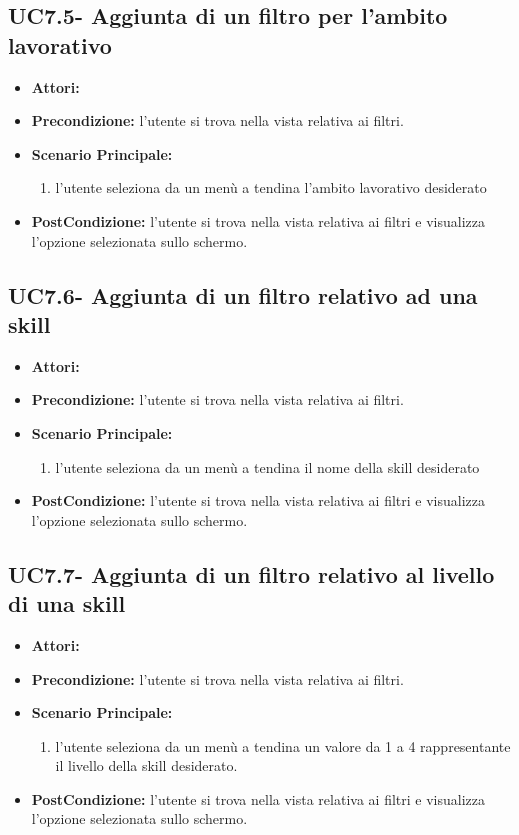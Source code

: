 \subsection{UC7.5- Aggiunta di un filtro per l'ambito lavorativo}
\begin{itemize}
	\item \textbf{Attori:}\loggedusr
	\item \textbf{Precondizione:} l'utente si trova nella vista relativa ai filtri.
	\item \textbf{Scenario Principale:}
	\begin{enumerate}
		\item l'utente seleziona da un menù a tendina l'ambito lavorativo desiderato
	\end{enumerate}
	\item \textbf{PostCondizione:}  l'utente si trova nella vista relativa ai filtri e visualizza l'opzione selezionata sullo schermo.
\end{itemize}

\subsection{UC7.6- Aggiunta di un filtro relativo ad una skill }
\begin{itemize}
	\item \textbf{Attori:}\loggedusr
	\item \textbf{Precondizione:} l'utente si trova nella vista relativa ai filtri.
	\item \textbf{Scenario Principale:}
	\begin{enumerate}
		\item l'utente seleziona da un menù a tendina il nome della skill desiderato
	\end{enumerate}
	\item \textbf{PostCondizione:}  l'utente si trova nella vista relativa ai filtri e visualizza l'opzione selezionata sullo schermo.
\end{itemize}

\subsection{UC7.7- Aggiunta di un filtro relativo al livello di una skill}
\begin{itemize}
	\item \textbf{Attori:}\loggedusr
	\item \textbf{Precondizione:} l'utente si trova nella vista relativa ai filtri.
	\item \textbf{Scenario Principale:}
	\begin{enumerate}
		\item l'utente seleziona da un menù a tendina un valore da 1 a 4 rappresentante il livello della skill desiderato.
	\end{enumerate}
	\item \textbf{PostCondizione:}  l'utente si trova nella vista relativa ai filtri e visualizza l'opzione selezionata sullo schermo.
\end{itemize}

